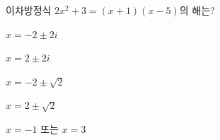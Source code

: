 이차방정식 $2x^2+3=(x+1)(x-5)$의 해는?
\begin{choicesii}{\rule[-3ex]{0pt}{8ex}$x=-2\pm 2i$}{\rule[-3ex]{0pt}{8ex}$x=2\pm 2i$}{\rule[-3ex]{0pt}{8ex}$x=-2\pm\sqrt{2}$}{\rule[-3ex]{0pt}{8ex}$x=2\pm\sqrt{2}$}{\rule[-3ex]{0pt}{8ex}$x=-1$ 또는 $x=3$}\end{choicesii}
